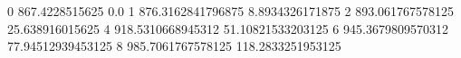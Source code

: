 0 867.4228515625 0.0
1 876.3162841796875 8.8934326171875
2 893.061767578125 25.638916015625
4 918.5310668945312 51.10821533203125
6 945.3679809570312 77.94512939453125
8 985.7061767578125 118.2833251953125
